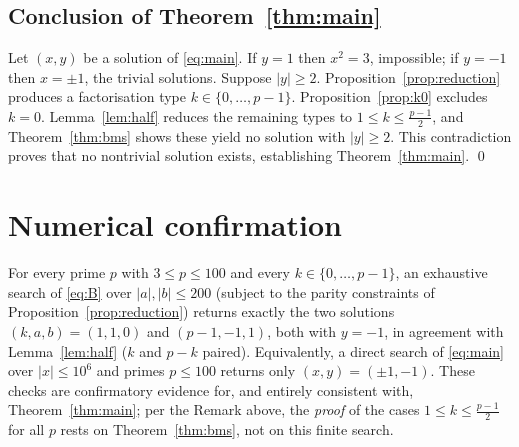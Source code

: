 \documentclass{amsart}
\theoremstyle{definition}
\begin{document}
\subsection*{Conclusion of Theorem~\ref{thm:main}}
Let $(x,y)$ be a solution of \eqref{eq:main}. If $y=1$ then $x^2=3$,
impossible; if $y=-1$ then $x=\pm1$, the trivial solutions. Suppose
$|y|\ge2$. Proposition~\ref{prop:reduction} produces a factorisation type
$k\in\{0,\dots,p-1\}$. Proposition~\ref{prop:k0} excludes $k=0$.
Lemma~\ref{lem:half} reduces the remaining types to $1\le k\le\frac{p-1}{2}$,
and Theorem~\ref{thm:bms} shows these yield no solution with $|y|\ge2$. This
contradiction proves that no nontrivial solution exists, establishing
Theorem~\ref{thm:main}. \qed

\section{Numerical confirmation}

For every prime $p$ with $3\le p\le100$ and every $k\in\{0,\dots,p-1\}$, an
exhaustive search of \eqref{eq:B} over $|a|,|b|\le 200$ (subject to the parity
constraints of Proposition~\ref{prop:reduction}) returns exactly the two
solutions $(k,a,b)=(1,1,0)$ and $(p-1,-1,1)$, both with $y=-1$, in agreement
with Lemma~\ref{lem:half} ($k$ and $p-k$ paired). Equivalently, a direct
search of \eqref{eq:main} over $|x|\le 10^6$ and primes $p\le 100$ returns only
$(x,y)=(\pm1,-1)$. These checks are confirmatory evidence for, and entirely
consistent with, Theorem~\ref{thm:main}; per the Remark above, the
\emph{proof} of the cases $1\le k\le\frac{p-1}{2}$ for all $p$ rests on
Theorem~\ref{thm:bms}, not on this finite search.
\end{document}

